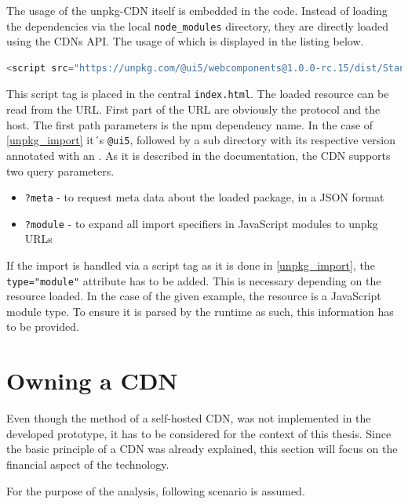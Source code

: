 The usage of the unpkg-CDN itself is embedded in the code. Instead of loading the dependencies via the local \texttt{node\_modules} directory, they are directly loaded using the CDNs API. The usage of which is displayed in the listing below.

\begin{lstlisting}[language=JavaScript, caption=Import of a dependecy using the unpkg API, label=unpkg_import]
	<script src="https://unpkg.com/@ui5/webcomponents@1.0.0-rc.15/dist/StandardListItem.js?module" type="module"></script>
\end{lstlisting}

This script tag is placed in the central \texttt{index.html}. The loaded resource can be read from the URL. First part of the URL are obviously the protocol and the host. The first path parameters is the npm dependency name. In the case of \ref{unpkg_import} it´s \texttt{@ui5}, followed by a sub directory with its respective version annotated with an \@.
As it is described in the documentation, the CDN supports two query parameters.

\begin{itemize}[noitemsep]
	\item \texttt{?meta} - to request meta data about the loaded package, in a JSON format
	\item \texttt{?module} - to expand all import specifiers in JavaScript modules to unpkg URLs
\end{itemize}

If the import is handled via a script tag as it is done in \ref{unpkg_import}, the \texttt{type="module"} attribute has to be added. This is necessary depending on the resource loaded.
In the case of the given example, the resource is a JavaScript module type. To ensure it is parsed by the runtime as such, this information has to be provided.\cite{js_module_type}

\section{Owning a CDN}

Even though the method of a self-hosted CDN, was not implemented in the developed prototype, it has to be considered for the context of this thesis. Since the basic principle of a CDN was already explained, this section will focus on the financial aspect of the technology.

For the purpose of the analysis, following scenario is assumed.

